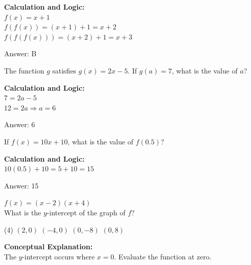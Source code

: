 \documentclass[11pt,paper=a4,answers]{exam}
\begin{document}
\begin{questions}
\begin{solution}
\textbf{Calculation and Logic:} \\
$f(x) = x+1$ \\
$f(f(x)) = (x+1) + 1 = x+2$ \\
$f(f(f(x))) = (x+2) + 1 = x+3$

\vspace{30pt}

Answer: \colorbox{yellow!100}{B}
\end{solution}

\vspace{40pt}

\question
The function $g$ satisfies $g(x) = 2x - 5$. If $g(a) = 7$, what is the value of $a$?

\begin{solution}
\textbf{Calculation and Logic:} \\
$7 = 2a - 5$ \\
$12 = 2a \Rightarrow a = 6$

\vspace{30pt}

Answer: \colorbox{yellow!100}{6}
\end{solution}

\vspace{40pt}

\question
If $f(x) = 10x + 10$, what is the value of $f(0.5)$?

\begin{solution}
\textbf{Calculation and Logic:} \\
$10(0.5) + 10 = 5 + 10 = 15$

\vspace{30pt}

Answer: \colorbox{yellow!100}{15}
\end{solution}

\vspace{40pt}

\question
$f(x) = (x-2)(x+4)$ \\
What is the $y$-intercept of the graph of $f$?
\begin{tasks}(4)
    \task $(2, 0)$
    \task $(-4, 0)$
    \task $(0, -8)$
    \task $(0, 8)$
\end{tasks}

\begin{solution}
\textbf{Conceptual Explanation:} \\
The $y$-intercept occurs where $x=0$. Evaluate the function at zero.


\end{solution}
\end{questions}
\end{document}
